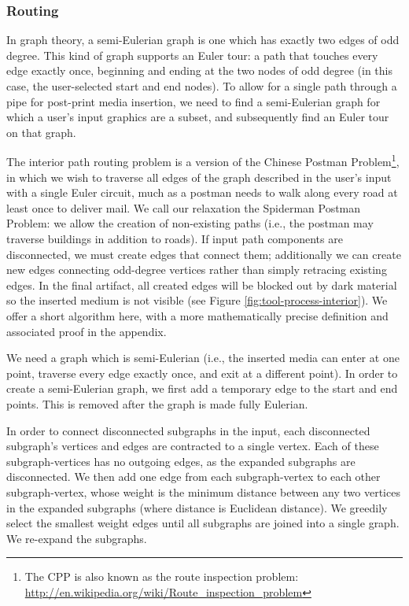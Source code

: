 \subsubsection{Routing}
In graph theory, a semi-Eulerian graph is one which has exactly two edges of odd degree.  This kind of graph supports an Euler tour: a path that touches every edge exactly once, beginning and ending at the two nodes of odd degree (in this case, the user-selected start and end nodes).  To allow for a single path through a pipe for post-print media insertion, we need to find a semi-Eulerian graph for which a user's input graphics are a subset, and subsequently find an Euler tour on that graph.

The interior path routing problem is a version of the Chinese Postman Problem\footnote{The CPP is also known as the route inspection problem: \url{http://en.wikipedia.org/wiki/Route_inspection_problem}}, in which we wish to traverse all edges of the graph described in the user's input with a single Euler circuit, much as a postman needs to walk along every road at least once to deliver mail.  We call our relaxation the Spiderman Postman Problem: we allow the creation of non-existing paths (i.e., the postman may traverse buildings in addition to roads).  If input path components are disconnected, we must create edges that connect them; additionally we can create new edges connecting odd-degree vertices rather than simply retracing existing edges.  In the final artifact, all created edges will be blocked out by dark material so the inserted medium is not visible (see Figure \ref{fig:tool-process-interior}).  We offer a short algorithm here, with a more mathematically precise definition and associated proof in the appendix.

We need a graph which is semi-Eulerian (i.e., the inserted media can enter at one point, traverse every edge exactly once, and exit at a different point).  In order to create a semi-Eulerian graph, we first add a temporary edge to the start and end points.  This is removed after the graph is made fully Eulerian.

In order to connect disconnected subgraphs in the input, each disconnected subgraph's vertices and edges are contracted to a single vertex.  Each of these subgraph-vertices has no outgoing edges, as the expanded subgraphs are disconnected.  We then add one edge from each subgraph-vertex to each other subgraph-vertex, whose weight is the minimum distance between any two vertices in the expanded subgraphs (where distance is Euclidean distance).  We greedily select the smallest weight edges until all subgraphs are joined into a single graph.  We re-expand the subgraphs.

